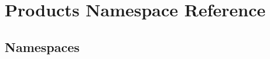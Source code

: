 \hypertarget{namespace_products}{}\section{Products Namespace Reference}
\label{namespace_products}
\subsection*{Namespaces}
\begin{DoxyCompactItemize}
\end{DoxyCompactItemize}
